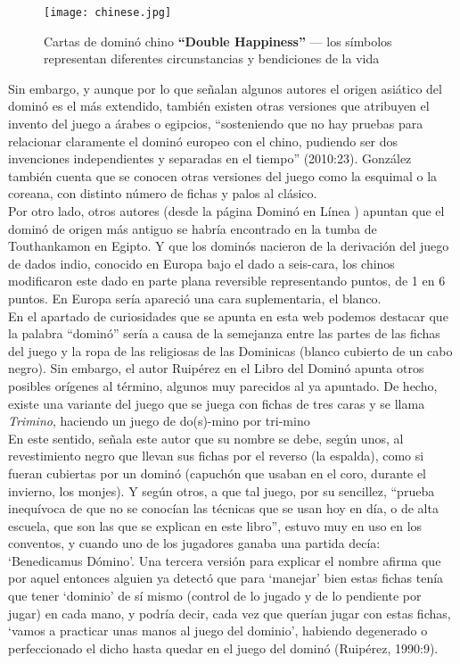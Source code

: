 \begin{figure}[h]
  \label{}
  \begin{center}
    \texttt{[image: chinese.jpg]}
  \end{center}
  \caption{Cartas de dominó chino \textbf{“Double Happiness”} --- los símbolos representan diferentes
            circunstancias y bendiciones de la vida }
\end{figure}

Sin embargo, y aunque por lo que señalan algunos autores el origen asiático del dominó es el más
extendido, también existen otras versiones que atribuyen el invento del juego a árabes o egipcios,
“sosteniendo que no hay pruebas para relacionar claramente el dominó europeo con el chino, pudiendo
ser dos invenciones independientes y separadas en el tiempo” (2010:23). González también cuenta que
se conocen otras versiones del juego como la esquimal o la coreana, con distinto número de fichas
y palos al clásico. \\

Por otro lado, otros autores (desde la página Dominó en Línea \cite{website:dominoenlinea}) apuntan que el dominó
de origen más antiguo se habría encontrado en la tumba de Touthankamon en Egipto. Y que los dominós nacieron de la derivación del juego de dados indio, conocido en Europa bajo el dado a seis-cara, los chinos modificaron este dado en parte plana reversible representando puntos, de 1 en 6 puntos. En Europa sería apareció una cara suplementaria, el blanco. \\

En el apartado de curiosidades que se apunta en esta web podemos destacar que la palabra “dominó”
sería a causa de la semejanza entre las partes de las fichas del juego y la ropa de las religiosas
de las Dominicas (blanco cubierto de un cabo negro). Sin embargo, el autor Ruipérez en el Libro
del Dominó apunta otros posibles orígenes al término, algunos muy parecidos al ya apuntado. De hecho, existe una variante del juego que se juega con fichas de tres caras y se llama \emph{Trimino}, haciendo un juego de do(s)-mino por tri-mino \cite{website:trimino}\\

En este sentido, señala este autor que su nombre se debe, según unos, al revestimiento negro que
llevan sus fichas por el reverso (la espalda), como si fueran cubiertas por un dominó (capuchón
que usaban en el coro, durante el invierno, los monjes). Y según otros, a que tal juego, por su
sencillez, “prueba inequívoca de que no se conocían las técnicas que se usan hoy en día, o de alta
escuela, que son las que se explican en este libro”, estuvo muy en uso en los conventos, y cuando
uno de los jugadores ganaba una partida decía: ‘Benedicamus Dómino’. Una tercera versión para
explicar el nombre afirma que por aquel entonces alguien ya detectó que para ‘manejar’ bien estas
fichas tenía que tener ‘dominio’ de sí mismo (control de lo jugado y de lo pendiente por jugar) en
cada mano, y podría decir, cada vez que querían jugar con estas fichas, ‘vamos a practicar unas
manos al juego del dominio’, habiendo degenerado o perfeccionado el dicho hasta quedar en el juego
del dominó (Ruipérez, 1990:9). \\

